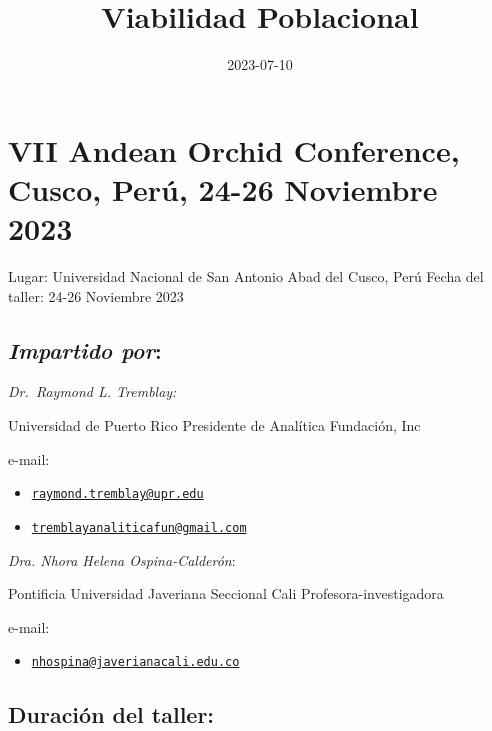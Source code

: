 \documentclass[
]{book}
\title{Viabilidad Poblacional}
\author{}
\date{\vspace{-2.5em}2023-07-10}
\providecommand{\tightlist}{%
  \setlength{\itemsep}{0pt}\setlength{\parskip}{0pt}}
\theoremstyle{definition}
\theoremstyle{definition}
\theoremstyle{definition}
\theoremstyle{definition}
\theoremstyle{remark}
\begin{document}
\maketitle

{
\setcounter{tocdepth}{1}
\tableofcontents
}
\hypertarget{sec-vii-andean-orchid-conference-cusco-peruxfa-24-26-noviembre-2023}{%
\chapter{VII Andean Orchid Conference, Cusco, Perú, 24-26 Noviembre 2023}\label{sec-vii-andean-orchid-conference-cusco-peruxfa-24-26-noviembre-2023}}

Lugar: Universidad Nacional de San Antonio Abad del Cusco, Perú Fecha
del taller: 24-26 Noviembre 2023

\hypertarget{impartido-por}{%
\section{\texorpdfstring{\emph{Impartido por}:}{Impartido por:}}\label{impartido-por}}

\emph{Dr.~Raymond L. Tremblay:}

Universidad de Puerto Rico Presidente de Analítica Fundación, Inc

e-mail:

\begin{itemize}
\item
  \href{mailto:raymond.tremblay@upr.edu}{\nolinkurl{raymond.tremblay@upr.edu}}
\item
  \href{mailto:tremblayanaliticafun@gmail.com}{\nolinkurl{tremblayanaliticafun@gmail.com}}
\end{itemize}

\emph{Dra. Nhora Helena Ospina-Calderón}:

Pontificia Universidad Javeriana Seccional Cali Profesora-investigadora

e-mail:

\begin{itemize}
\tightlist
\item
  \href{mailto:nhospina@javerianacali.edu.co}{\nolinkurl{nhospina@javerianacali.edu.co}}
\end{itemize}

\hypertarget{duraciuxf3n-del-taller}{%
\section{Duración del taller:}\label{duraciuxf3n-del-taller}}
\end{document}
